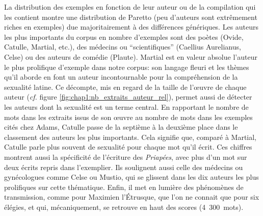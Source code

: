 La distribution des exemples en fonction de leur auteur ou de la compilation qui les contient montre une distribution de Paretto (peu d'auteurs sont extrêmement riches en exemples) due majoritairement à des différences génériques. Les auteurs les plus importants du corpus en nombre d'exemples sont des poètes (Ovide, Catulle, Martial, etc.), des médecins ou \enquote{scientifiques} (Caellius Aurelianus, Celse) ou des auteurs de comédie (Plaute). Martial est en valeur absolue l'auteur le plus prolifique d'exemple dans notre corpus: son langage fleuri et les thèmes qu'il aborde en font un auteur incontournable pour la compréhension de la sexualité latine. Ce décompte, mis en regard de la taille de l'œuvre de chaque auteur (\textit{cf.} figure \ref{fig:chap1:nb_extraits_auteur_rel}), permet aussi de détecter les auteurs dont la sexualité est un terme central. En rapportant le nombre de mots dans les extraits issus de son œuvre au nombre de mots dans les exemples cités chez Adams, Catulle passe de la septième à la deuxième place dans le classement des auteurs les plus importants. Cela signifie que, comparé à Martial, Catulle parle plus souvent de sexualité pour chaque mot qu'il écrit. Ces chiffres montrent aussi la spécificité de l'écriture des \textit{Priapées}, avec plus d'un mot sur deux écrits repris dans l'exemplier. Ils soulignent aussi celle des médecins ou gynécologues comme Celse ou Mustio, qui se glissent dans les dix auteurs les plus prolifiques sur cette thématique. Enfin, il met en lumière des phénomènes de transmission, comme pour Maximien l'Étrusque, que l'on ne connait que pour six élégies, et qui, mécaniquement, se retrouve en haut des scores (4~300~mots).

